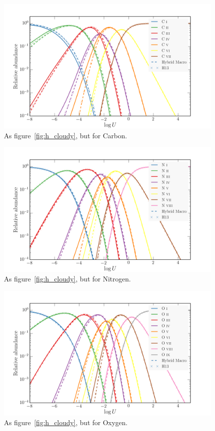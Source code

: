 \begin{figure}
\centering
\includegraphics[width=1.0\textwidth]{figures/03-radtrans/ca_comp.png}
\caption
{
As figure~\ref{fig:h_cloudy}, but for Carbon.
}
\label{fig:c_cloudy}
\end{figure}

\begin{figure}
\centering
\includegraphics[width=1.0\textwidth]{figures/03-radtrans/ni_comp.png}
\caption{
As figure~\ref{fig:h_cloudy}, but for Nitrogen.
}
\label{fig:n_cloudy}
\end{figure}

\begin{figure}
\centering
\includegraphics[width=1.0\textwidth]{figures/03-radtrans/ox_comp.png}
\caption
{
As figure~\ref{fig:h_cloudy}, but for Oxygen.
}
\label{fig:ox_cloudy}
\end{figure}

